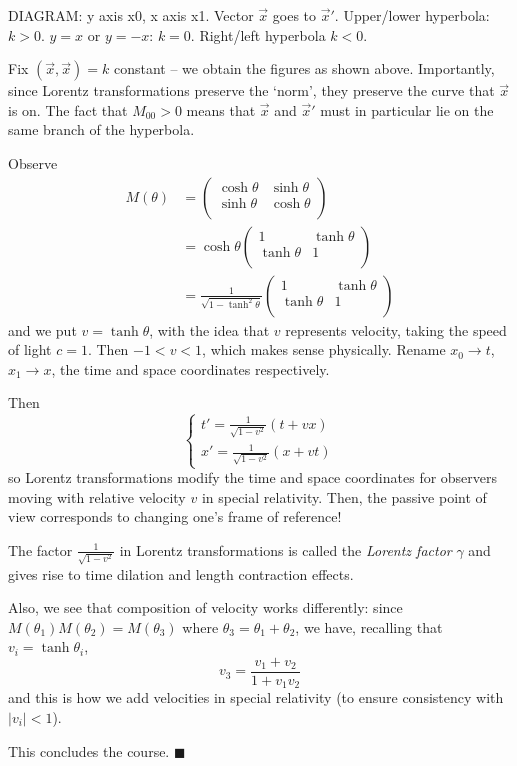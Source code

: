\documentclass{../../template/note}
\begin{document}
    DIAGRAM: y axis x0, x axis x1. Vector \(\vec x\) goes to \(\vec x'\).
    Upper/lower hyperbola: \(k > 0\). \(y=x\) or \(y=-x\): \(k = 0\). Right/left hyperbola \(k < 0\).

    Fix \((\vec x, \vec x) = k\) constant -- we obtain the figures as shown above. Importantly, since Lorentz transformations preserve the `norm', they preserve the curve that \(\vec x\) is on. The fact that \(M_{00} > 0\) means that \(\vec x\) and \(\vec x'\) must in particular lie on the same branch of the hyperbola.

    Observe
    \begin{align*}
        M(\theta) &= \begin{pmatrix}
         \cosh \theta & \sinh \theta \\
         \sinh \theta & \cosh \theta \\
        \end{pmatrix} \\
        &= \cosh \theta \begin{pmatrix}
         1 & \tanh \theta \\
         \tanh \theta & 1 \\
        \end{pmatrix} \\
        &= \frac{1}{\sqrt{1-\tanh^2\theta}} \begin{pmatrix}
         1 & \tanh \theta \\
         \tanh \theta & 1 \\
        \end{pmatrix}
    \end{align*}
    and we put \(v = \tanh \theta\), with the idea that \(v\) represents velocity, taking the speed of light \(c=1\). Then \(-1 < v < 1\), which makes sense physically. Rename \(x_0 \to t\), \(x_1 \to x\), the time and space coordinates respectively.
    
    Then
    \[
        \begin{cases}
            t' = \frac{1}{\sqrt{1-v^2}}(t+vx) \\
            x' = \frac{1}{\sqrt{1-v^2}}(x+vt)
        \end{cases}
    \]
    so Lorentz transformations modify the time and space coordinates for observers moving with relative velocity \(v\) in special relativity. Then, the passive point of view corresponds to changing one's frame of reference!

    The factor \(\frac{1}{\sqrt{1-v^2}}\) in Lorentz transformations is called the \emph{Lorentz factor} \(\gamma\) and gives rise to time dilation and length contraction effects.

    Also, we see that composition of velocity works differently: since \(M(\theta_1)M(\theta_2) = M(\theta_3)\) where \(\theta_3 = \theta_1 + \theta_2\), we have, recalling that \(v_i = \tanh \theta_i\),
    \[
        v_3 = \frac{v_1+v_2}{1+v_1v_2}
    \]
    and this is how we add velocities in special relativity (to ensure consistency with \(|v_i| < 1\)).

    This concludes the course. \(\blacksquare\)
    
    
\end{document}
